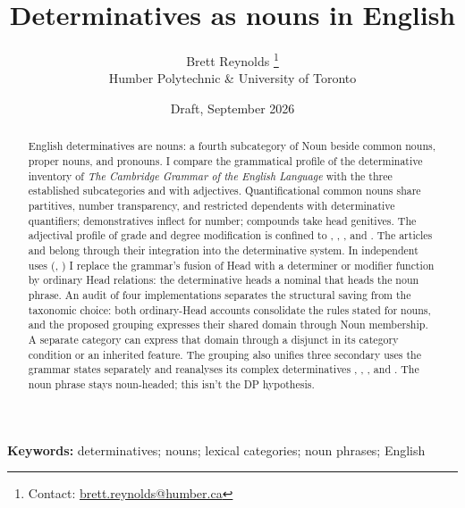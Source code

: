 \documentclass[12pt]{article}
\title{Determinatives as nouns in English}
\author{Brett Reynolds \orcidlink{0000-0003-0073-7195}%
\thanks{Contact: \href{mailto:brett.reynolds@humber.ca}{brett.reynolds@humber.ca}}\\
Humber Polytechnic \& University of Toronto}
\date{Draft, September 2026}
\begin{document}
\maketitle

\begin{abstract}
English determinatives are nouns: a fourth subcategory of Noun beside common nouns, proper nouns, and pronouns. I compare the grammatical profile of the determinative inventory of \textit{The Cambridge Grammar of the English Language} with the three established subcategories and with adjectives. Quantificational common nouns share partitives, number transparency, and restricted dependents with determinative quantifiers; demonstratives inflect for number; compounds take head genitives. The adjectival profile of grade and degree modification is confined to , , , and . The articles and  belong through their integration into the determinative system. In independent uses (, ) I replace the grammar's fusion of Head with a determiner or modifier function by ordinary Head relations: the determinative heads a nominal that heads the noun phrase. An audit of four implementations separates the structural saving from the taxonomic choice: both ordinary-Head accounts consolidate the rules stated for nouns, and the proposed grouping expresses their shared domain through Noun membership. A separate category can express that domain through a disjunct in its category condition or an inherited feature. The grouping also unifies three secondary uses the grammar states separately and reanalyses its complex determinatives , , , and . The noun phrase stays noun-headed; this isn't the DP hypothesis.
\end{abstract}

\noindent\textbf{Keywords:} determinatives; nouns; lexical categories; noun phrases; English

\par\medskip
{}
\medskip
\end{document}
